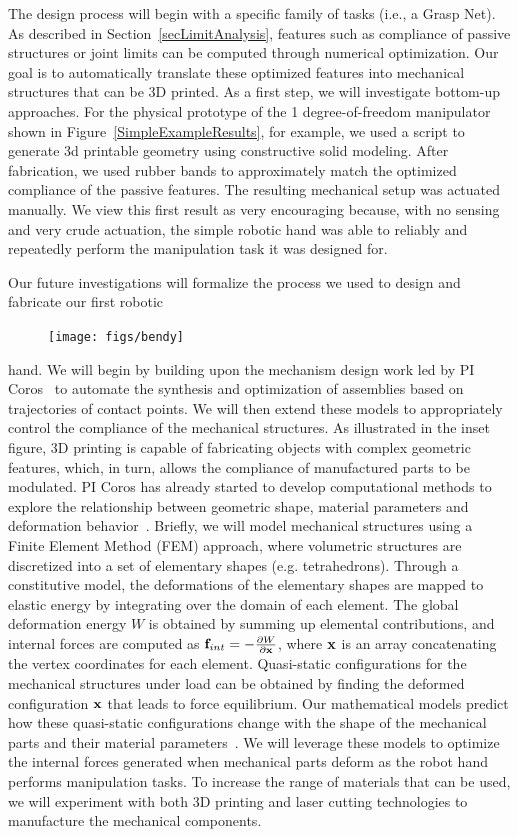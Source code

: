 The design process will begin with a specific family of tasks (i.e., a Grasp Net). As described in Section~\ref{secLimitAnalysis}, features such as compliance of passive structures or joint limits can be computed through numerical optimization. Our goal is to automatically translate these optimized features into mechanical structures that can be 3D printed. As a first step, we will investigate bottom-up approaches. For the physical prototype of the 1 degree-of-freedom manipulator shown in Figure~\ref{SimpleExampleResults}, for example, we used a script to generate 3d printable geometry using constructive solid modeling. After fabrication, we used rubber bands to approximately match the optimized compliance of the passive features. The resulting mechanical setup was actuated manually. We view this first result as very encouraging because, with no sensing and very crude actuation, the simple robotic hand was able to reliably and repeatedly perform the manipulation task it was designed for.

Our future investigations will formalize the process we used to design and fabricate our first robotic
\begin{figure}
\vspace{-4mm}
\texttt{[image: figs/bendy]}
\vspace{-7mm}
\end{figure}hand. We will begin by building upon the mechanism design work led by PI Coros~\cite{Coros2013,Bacher2015} to automate the synthesis and optimization of assemblies based on trajectories of contact points. We will then extend these models to appropriately control the compliance of the mechanical structures. As illustrated in the inset figure, 3D printing is capable of fabricating objects with complex geometric features, which, in turn, allows the compliance of manufactured parts to be modulated. PI Coros has already started to develop computational methods to explore the relationship between geometric shape, material parameters and deformation behavior~\cite{Skouras2013,Jesus2015}. Briefly, we will model mechanical structures using a Finite Element Method (FEM) approach, where volumetric structures are discretized into a set of elementary shapes (e.g. tetrahedrons). Through a constitutive model, the deformations of the elementary shapes are mapped to elastic energy by integrating over the domain of each element. The global deformation energy $W$ is obtained by summing up elemental contributions, and internal forces are computed as $\textbf{f}_{int} = -\frac{\partial W}{\partial \mathbf{x}}$, where $\mathbf{x}$ is an array concatenating the vertex coordinates for each element. Quasi-static configurations for the mechanical structures under load can be obtained by finding the deformed configuration $\mathbf{x}$ that leads to force equilibrium. Our mathematical models predict how these quasi-static configurations change with the shape of the mechanical parts and their material parameters~\cite{Skouras2013}. We will leverage these models to optimize the internal forces generated when mechanical parts deform as the robot hand performs manipulation tasks. To increase the range of materials that can be used, we will experiment with both 3D printing and laser cutting technologies to manufacture the mechanical components.

